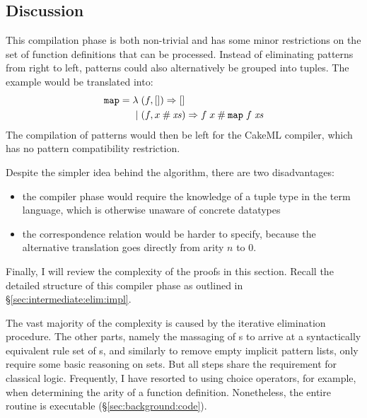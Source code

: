 \subsection{Discussion}
\label{sec:intermediate:elim:discussion}

This compilation phase is both non-trivial and has some minor restrictions on the set of function definitions that can be processed.
Instead of eliminating patterns from right to left, patterns could also alternatively be grouped into tuples.
The  example would be translated into:
%
\begin{align*}
  \texttt{\textup{map}} = \lambda\; &(f, []) \Rightarrow [] \\
  |\;&(f, x \mathbin{\mathtt{\#}} \mathit{xs}) \Rightarrow f\;x \mathbin{\mathtt{\#}} \texttt{\textup{map}}\;f\;\mathit{xs}
\end{align*}
%
The compilation of patterns would then be left for the CakeML compiler, which has no pattern compatibility restriction.

Despite the simpler idea behind the algorithm, there are two disadvantages:
\begin{itemize}
  \item the compiler phase would require the knowledge of a tuple type in the term language, which is otherwise unaware of concrete datatypes
  \item the correspondence relation would be harder to specify, because the alternative translation goes directly from arity $n$ to $0$.
\end{itemize}

\noindent
Finally, I will review the complexity of the proofs in this section.
Recall the detailed structure of this compiler phase as outlined in §\ref{sec:intermediate:elim:impl}.

The vast majority of the complexity is caused by the iterative elimination procedure.
The other parts, namely the massaging of s to arrive at a syntactically equivalent rule set of s, and similarly to remove empty implicit pattern lists, only require some basic reasoning on sets.
But all steps share the requirement for classical logic.
Frequently, I have resorted to using choice operators, for example, when determining the arity of a function definition.
Nonetheless, the entire routine is executable (§\ref{sec:background:code}).